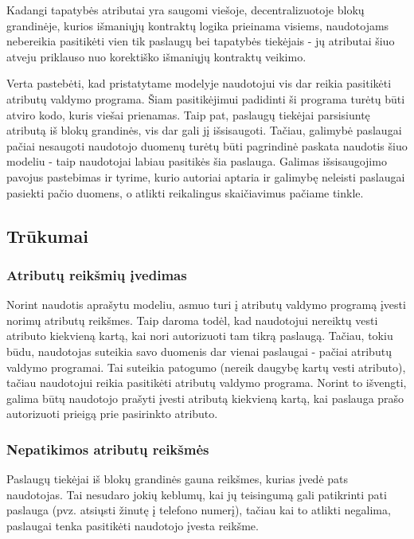 Kadangi tapatybės atributai yra saugomi viešoje, decentralizuotoje blokų grandinėje, kurios išmaniųjų kontraktų
logika prieinama visiems, naudotojams nebereikia pasitikėti vien tik paslaugų bei tapatybės tiekėjais - jų
atributai šiuo atveju priklauso nuo korektiško išmaniųjų kontraktų veikimo.

Verta pastebėti, kad pristatytame modelyje naudotojui vis dar reikia pasitikėti atributų valdymo programa. Šiam pasitikėjimui
padidinti ši programa turėtų būti atviro kodo, kuris viešai prienamas. Taip pat, paslaugų tiekėjai parsisiuntę atributą
iš blokų grandinės, vis dar gali jį išsisaugoti. Tačiau, galimybė paslaugai pačiai nesaugoti naudotojo duomenų turėtų būti pagrindinė paskata
naudotis šiuo modeliu - taip naudotojai labiau pasitikės šia paslauga. Galimas išsisaugojimo pavojus pastebimas ir
\cite{MITPaper} tyrime, kurio autoriai aptaria ir galimybę neleisti paslaugai pasiekti pačio duomens, o atlikti
reikalingus skaičiavimus pačiame tinkle.

\subsection{Trūkumai}

\subsubsection{Atributų reikšmių įvedimas}

Norint naudotis aprašytu modeliu, asmuo turi į atributų valdymo programą įvesti norimų atributų reikšmes. Taip daroma todėl,
kad naudotojui nereiktų vesti atributo kiekvieną kartą, kai nori autorizuoti tam tikrą paslaugą. Tačiau, tokiu būdu,
naudotojas suteikia savo duomenis dar vienai paslaugai - pačiai atributų valdymo programai. Tai suteikia patogumo (nereik
daugybę kartų vesti atributo), tačiau naudotojui reikia pasitikėti atributų valdymo programa. Norint to išvengti,
galima būtų naudotojo prašyti įvesti atributą kiekvieną kartą, kai paslauga prašo autorizuoti prieigą prie pasirinkto atributo.

\subsubsection{Nepatikimos atributų reikšmės}

Paslaugų tiekėjai iš blokų grandinės gauna reikšmes, kurias įvedė pats naudotojas. Tai nesudaro jokių keblumų,
kai jų teisingumą gali patikrinti pati paslauga (pvz. atsiųsti žinutę į telefono numerį), tačiau kai to atlikti negalima,
paslaugai tenka pasitikėti naudotojo įvesta reikšme.

